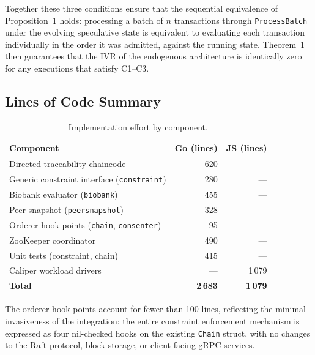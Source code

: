 Together these three conditions ensure that the sequential equivalence of
Proposition~1 holds: processing a batch of $n$ transactions through
\texttt{ProcessBatch} under the evolving speculative state is equivalent to
evaluating each transaction individually in the order it was admitted, against
the running state.  Theorem~1 then guarantees that the IVR of the endogenous
architecture is identically zero for any executions that satisfy C1--C3.

\subsection{Lines of Code Summary}
\label{subsec:impl-loc}

\begin{table}[h]
\centering
\caption{Implementation effort by component.}
\label{tab:loc}
\begin{tabular}{lrr}
\toprule
Component & Go (lines) & JS (lines) \\
\midrule
Directed-traceability chaincode            & 620  & —   \\
Generic constraint interface (\texttt{constraint}) & 280  & —   \\
Biobank evaluator (\texttt{biobank})       & 455  & —   \\
Peer snapshot (\texttt{peersnapshot})      & 328  & —   \\
Orderer hook points (\texttt{chain}, \texttt{consenter}) & 95 & — \\
ZooKeeper coordinator                      & 490  & —   \\
Unit tests (constraint, chain)             & 415  & —   \\
Caliper workload drivers                   & —    & 1\,079 \\
\midrule
\textbf{Total}                             & \textbf{2\,683} & \textbf{1\,079} \\
\bottomrule
\end{tabular}
\end{table}

The orderer hook points account for fewer than 100 lines, reflecting the
minimal invasiveness of the integration: the entire constraint enforcement
mechanism is expressed as four nil-checked hooks on the existing \texttt{Chain}
struct, with no changes to the Raft protocol, block storage, or client-facing
gRPC services.
